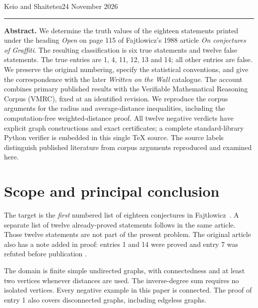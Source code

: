 \documentclass[11pt,a4paper]{article}
\theoremstyle{remark}\newtheorem{remark}[theorem]{Remark}
\begin{document}
\thispagestyle{plain}
\par
\vspace{9pt}
\par
\vspace{6pt}
\par
\vspace{8pt}
\noindent Keio and Shaitetsu\hfill 24 November 2026\par
\vspace{10pt}\hrule\vspace{10pt}
\noindent\textbf{Abstract.}
We determine the truth values of the eighteen statements printed under the heading
\emph{Open} on page 115 of Fajtlowicz's 1988 article \emph{On conjectures of Graffiti}.
The resulting classification is six true statements and twelve false statements.
The true entries are 1, 4, 11, 12, 13 and 14; all other entries are false.
We preserve the original numbering, specify the statistical conventions, and give
the correspondence with the later \emph{Written on the Wall} catalogue.
The account combines primary published results with the Verifiable Mathematical
Reasoning Corpus (VMRC), fixed at an identified revision. We reproduce the corpus
arguments for the radius and average-distance inequalities, including the
computation-free weighted-distance proof. All twelve negative verdicts have
explicit graph constructions and exact certificates; a complete standard-library
Python verifier is embedded in this single TeX source. The source labels distinguish
published literature from corpus arguments reproduced and examined here.

\section{Scope and principal conclusion}
The target is the \emph{first} numbered list of eighteen conjectures in
Fajtlowicz~\cite[p.~115]{fajtlowicz}. A separate list of twelve already-proved
statements follows in the same article. Those twelve statements are not part of
the present problem. The original article also has a note added in proof:
entries 1 and 14 were proved and entry 7 was refuted before publication
\cite[p.~118]{fajtlowicz}.

The domain is finite simple undirected graphs, with connectedness and at least
two vertices whenever distances are used. The inverse-degree sum requires no
isolated vertices. Every negative example in this paper is connected. The proof
of entry 1 also covers disconnected graphs, including edgeless graphs.
\end{document}
